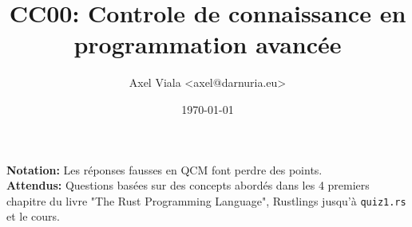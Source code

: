 \documentclass[11pt,a4paper,addpoint]{exam}
\author{Axel Viala <axel@darnuria.eu>}
\title{CC00: Controle de connaissance en programmation avancée}
\date{\today}
\begin{document}
  \maketitle

  \textbf{Notation:} Les réponses fausses en QCM font perdre des points.\\
  \textbf{Attendus:} Questions basées sur des concepts abordés dans les 4 premiers chapitre du livre "The Rust Programming Language", Rustlings jusqu'à \texttt{quiz1.rs} et le cours.
\end{document}
